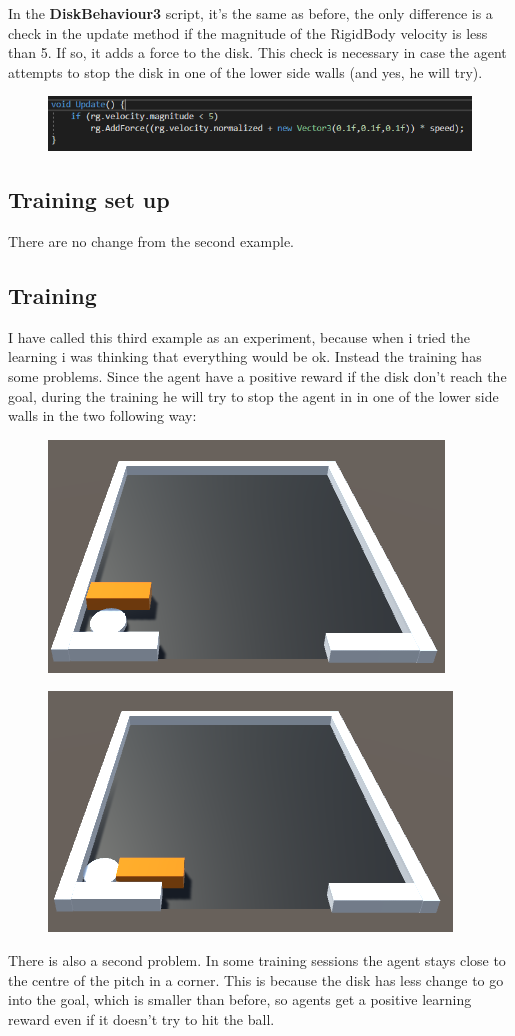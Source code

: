 \documentclass[12pt]{article}
\begin{document}
	\noindent
	In the \textbf{DiskBehaviour3} script, it's the same as before, the only difference  is a check in the update method if the magnitude of the RigidBody velocity is less than 5. If so, it adds a force to the disk. This check is necessary in case the agent attempts to stop the disk in one of the lower side walls (and yes, he will try).
	
	\begin{figure}[hbt!]
		\centering
		\includegraphics[width= 1
		\textwidth]{images/DiskBehaviour3.png}
	\end{figure}

	\subsection{Training set up}
	There are no change from the second example.
	
	\subsection{Training}
	I have called this third example as an experiment, because when i tried the learning i was thinking that everything would be ok. Instead the training has some problems. Since the agent have a positive reward if the disk don't reach the goal, during the training he will try to stop the agent in in one of the lower side walls in the two following way:
	
	\begin{figure}[hbt!]
		\centering
		\includegraphics[width= 0.49
		\textwidth]{images/Obstacle1.png}
	\end{figure}

	\begin{figure}[hbt!]
		\centering
		\includegraphics[width= 0.49
		\textwidth]{images/Obstacle2.png}
	\end{figure}
	
	\noindent
	There is also a second problem. In some training sessions the agent stays close to the centre of the pitch in a corner. This is because the disk has less change to go into the goal, which is smaller than before, so agents get a positive learning reward even if it doesn't try to hit the ball.
	
\end{document}
